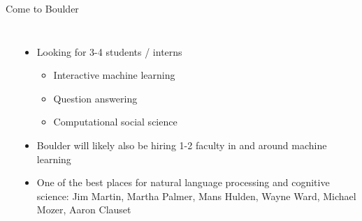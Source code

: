\documentclass[compress]{beamer}
\begin{document}
\begin{frame}{Come to Boulder}
\begin{columns}
{           }
		\begin{itemize}
			\item Looking for 3-4 students / interns
			\begin{itemize}
				\item Interactive machine learning
				\item Question answering
				\item Computational social science
			\end{itemize}
			\item Boulder will likely also be hiring 1-2
                          faculty in and around machine learning
                        \item<2> One of the best places for natural
                          language processing and cognitive science: Jim Martin, Martha
                          Palmer, Mans Hulden, Wayne Ward, Michael
                          Mozer, Aaron Clauset
		\end{itemize}
\end{columns}

\end{frame}
\end{document}
